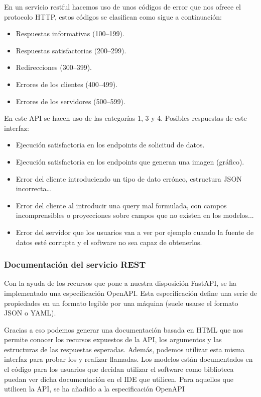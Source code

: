 En un servicio restful hacemos uso de unos códigos de error que nos ofrece el protocolo
HTTP, estos códigos se clasifican como sigue a continuación:
\begin{itemize}
    \item Respuestas informativas (100–199).
    \item Respuestas satisfactorias (200–299).
    \item Redirecciones (300–399).
    \item Errores de los clientes (400–499).
    \item Errores de los servidores (500–599).
\end{itemize}

En este API se hacen uso de las categorías 1, 3 y 4. Posibles respuestas de este interfaz:
\begin{itemize}
    \item {} Ejecución satisfactoria en los endpoints de solicitud de datos.
    \item {} Ejecución satisfactoria en los endpoints que generan una imagen
    (gráfico).
    \item {} Error del cliente introduciendo un tipo de dato erróneo,
    estructura JSON incorrecta\ldots
    \item {} Error del cliente al introducir una query mal formulada, con
    campos incomprensibles o proyecciones sobre campos que no existen en los modelos...
    \item {} Error del servidor que los usuarios van a ver por ejemplo cuando
    la fuente de datos esté corrupta y el software no sea capaz de obtenerlos.
\end{itemize}

\subsubsection{Documentación del servicio REST}
Con la ayuda de los recursos que pone a nuestra disposición FastAPI, se ha implementado
una especificación OpenAPI. Esta especificación define una serie de propiedades en un
formato legible por una máquina (suele usarse el formato JSON o YAML).

Gracias a eso podemos generar una documentación basada en HTML que nos permite conocer los
recursos expuestos de la API, los argumentos y las estructuras de las respuestas
esperadas. Además, podemos utilizar esta misma interfaz para probar los
 y realizar llamadas. Los modelos están documentados en el código para
los usuarios que decidan utilizar el software como biblioteca puedan ver dicha
documentación en el IDE que utilicen. Para aquellos que utilicen la API, se ha añadido a
la especificación OpenAPI

